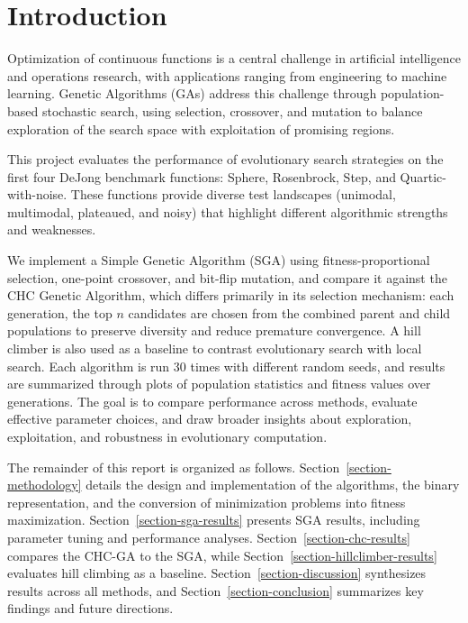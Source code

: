 \documentclass[11pt]{article}
\begin{document}
\noindent


\pagebreak

\section{Introduction}
\label{section-intro}

Optimization of continuous functions is a central challenge in artificial intelligence and operations research, with applications ranging from engineering to machine learning. Genetic Algorithms (GAs) address this challenge through population-based stochastic search, using selection, crossover, and mutation to balance exploration of the search space with exploitation of promising regions.

This project evaluates the performance of evolutionary search strategies on the first four DeJong benchmark functions: Sphere, Rosenbrock, Step, and Quartic-with-noise. These functions provide diverse test landscapes (unimodal, multimodal, plateaued, and noisy) that highlight different algorithmic strengths and weaknesses.

We implement a Simple Genetic Algorithm (SGA) using fitness-proportional selection, one-point crossover, and bit-flip mutation, and compare it against the CHC Genetic Algorithm, which differs primarily in its selection mechanism: each generation, the top $n$ candidates are chosen from the combined parent and child populations to preserve diversity and reduce premature convergence. A hill climber is also used as a baseline to contrast evolutionary search with local search. Each algorithm is run 30 times with different random seeds, and results are summarized through plots of population statistics and fitness values over generations. The goal is to compare performance across methods, evaluate effective parameter choices, and draw broader insights about exploration, exploitation, and robustness in evolutionary computation.

The remainder of this report is organized as follows. Section~\ref{section-methodology} details the design and implementation of the algorithms, the binary representation, and the conversion of minimization problems into fitness maximization. Section~\ref{section-sga-results} presents SGA results, including parameter tuning and performance analyses. Section~\ref{section-chc-results} compares the CHC-GA to the SGA, while Section~\ref{section-hillclimber-results} evaluates hill climbing as a baseline. Section~\ref{section-discussion} synthesizes results across all methods, and Section~\ref{section-conclusion} summarizes key findings and future directions.
\end{document}
